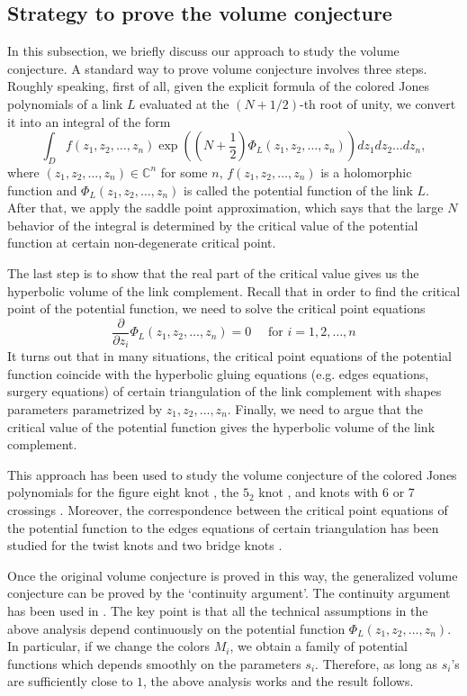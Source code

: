 \documentclass[10pt,a4paper]{article}
\newcommand{\lt}{\left}
\newcommand{\rt}{\right}
\def \CC{\mathbb C}
\def\CC{{\mathbb C}}
\begin{document}
\subsection{Strategy to prove the volume conjecture}\label{strate}
In this subsection, we briefly discuss our approach to study the volume conjecture. A standard way to prove volume conjecture involves three steps. Roughly speaking, first of all, given the explicit formula of the colored Jones polynomials of a link $L$ evaluated at the $(N+1/2)$-th root of unity, we convert it into an integral of the form 
$$\int_D f(z_1,z_2,\dots,z_n)\exp\lt( \lt(N+\frac{1}{2}\rt) \Phi_L(z_1,z_2,\dots,z_n) \rt) dz_1dz_2 \dots dz_n, $$
where $(z_1,z_2,\dots,z_n)\in \CC^n$ for some $n$, $f(z_1,z_2,\dots,z_n)$ is a holomorphic function and $\Phi_L(z_1,z_2,\dots,z_n)$ is called the potential function of the link $L$. After that, we apply the saddle point approximation, which says that the large $N$ behavior of the integral is determined by the critical value of the potential function at certain non-degenerate critical point. 

The last step is to show that the real part of the critical value gives us the hyperbolic volume of the link complement. Recall that in order to find the critical point of the potential function, we need to solve the critical point equations 
$$\frac{\partial}{\partial z_i}\Phi_L(z_1,z_2,\dots,z_n)=0 \quad\text{ for $i=1,2,\dots, n$}$$
It turns out that in many situations, the critical point equations of the potential function coincide with the hyperbolic gluing equations (e.g. edges equations, surgery equations) of certain triangulation of the link complement with shapes parameters parametrized by $z_1,z_2,\dots,z_n$. Finally, we need to argue that the critical value of the potential function gives the hyperbolic volume of the link complement.

This approach has been used to study the volume conjecture of the colored Jones polynomials for the figure eight knot \cite{HM13}, the $5_2$ knot \cite{O52}, and knots with 6 or 7 crossings \cite{O6,O7}. Moreover, the correspondence between the critical point equations of the potential function to the edges equations of certain triangulation has been studied for the twist knots \cite{CMY09} and two bridge knots \cite{KO05}.

Once the original volume conjecture is proved in this way, the generalized volume conjecture can be proved by the `continuity argument'. The continuity argument has been used in \cite{WA17}. The key point is that all the technical assumptions in the above analysis depend continuously on the potential function $\Phi_L(z_1,z_2,\dots,z_n)$. In particular, if we change the colors $M_i$, we obtain a family of potential functions which depends smoothly on the parameters $s_i$. Therefore, as long as $s_i$'s are sufficiently close to $1$, the above analysis works and the result follows.
\end{document}

